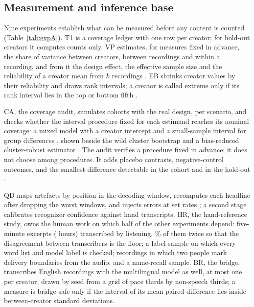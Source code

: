 \documentclass[letterpaper]{article} %
\newcommand{\expid}[1]{\textsc{#1}}
\begin{document}
\subsection{Measurement and inference base}

Nine experiments establish what can be measured before any content is counted (Table~\ref{tab:expA}). \expid{T1} is a coverage ledger with one row per creator; for hold-out creators it computes counts only. \expid{VP} estimates, for \VpMeasures{} measures fixed in advance, the share of variance between creators, between recordings and within a recording, and from it the design effect, the effective sample size and the reliability of a creator mean from $k$ recordings \cite{nakagawa2017coefficient}. \expid{EB} shrinks creator values by their reliability and draws rank intervals; a creator is called extreme only if its rank interval lies in the top or bottom fifth \cite{goldstein1996league}.

\expid{CA}, the coverage audit, simulates cohorts with the real design, \CaStudies{} per scenario, and checks whether the interval procedure fixed for each estimand reaches its nominal coverage: a mixed model with a creator intercept and a small-sample interval for group differences \cite{elff2021multilevel}, shown beside the wild cluster bootstrap \cite{cameron2008bootstrapbased,mackinnon2022clusterrobust} and a bias-reduced cluster-robust estimator \cite{pustejovsky2016small}. The audit verifies a procedure fixed in advance; it does not choose among procedures. It adds placebo contrasts, negative-control outcomes, and the smallest difference detectable in the cohort and in the hold-out \cite{card2020little}.

\expid{QD} maps artefacts by position in the decoding window, recomputes each headline after dropping the worst windows, and injects errors at set rates \cite{proksch2019testing,fetic2021topic}; a second stage calibrates recognizer confidence against hand transcripts. \expid{HR}, the hand-reference study, owns the human work on which half of the other experiments depend: \HrExcerpts{} five-minute excerpts (\HrExcerptHours{} hours) transcribed by listening, \HrDoublePct\% of them twice so that the disagreement between transcribers is the floor; a label sample on which every word list and model label is checked; \HrBoundaryRecordings{} recordings in which two people mark delivery boundaries from the audio; and a name-recall sample. \expid{BR}, the bridge, transcribes \NBridgeRecordings{} English recordings with the multilingual model as well, at most one per creator, drawn by seed from a grid of pace thirds by non-speech thirds; a measure is bridge-safe only if the interval of its mean paired difference lies inside \BridgeMargin{} between-creator standard deviations.
\end{document}
